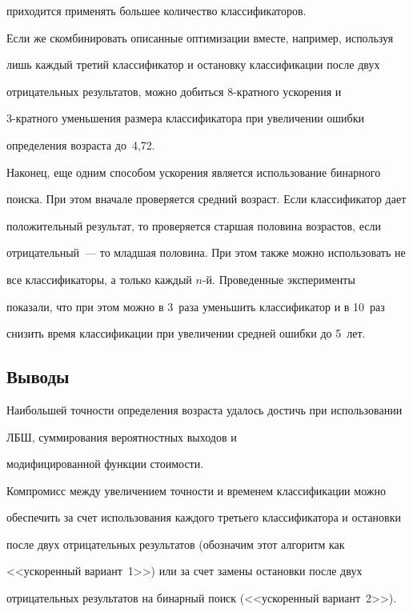 приходится применять большее количество классификаторов.

Если же скомбинировать описанные оптимизации вместе, например, используя

лишь каждый третий классификатор и остановку классификации после двух

отрицательных результатов, можно добиться 8-крат\-но\-го ускорения и

3-крат\-но\-го уменьшения размера классификатора при увеличении ошибки

определения возраста до~4,72.



Наконец, еще одним способом ускорения является использование бинарного

поиска. При этом вначале проверяется средний возраст. Если классификатор дает

положительный результат, то проверяется старшая половина возрастов, если

отрицательный~--- то младшая половина. При этом также можно использовать не

все классификаторы, а только каждый $n$-й. Проведенные эксперименты

показали, что при этом можно в 3~раза уменьшить классификатор и в 10~раз

снизить время классификации при увеличении средней ошибки до 5~лет.



\subsection{Выводы}



Наибольшей точности определения возраста удалось достичь при использовании

ЛБШ, суммирования вероятностных выходов и

модифицированной функции стоимости.

%

Компромисс между увеличением точности и временем классификации можно

обеспечить за счет использования каждого третьего классификатора и остановки

после двух отрицательных результатов (обозначим этот алгоритм как

<<ускоренный вариант~1>>) или за счет замены остановки после двух

отрицательных результатов на бинарный поиск (<<ускоренный вариант~2>>).

